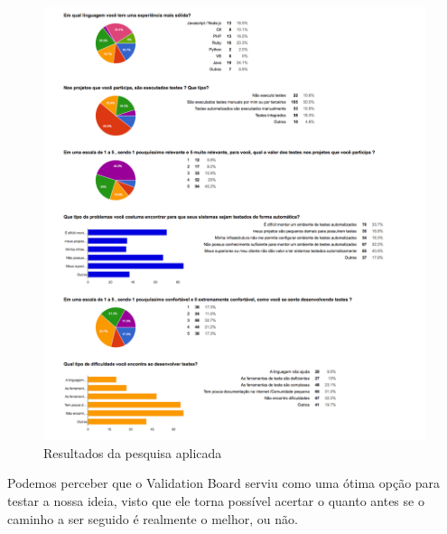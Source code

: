 \begin{figure}
  \centering
  \includegraphics[width=1.1\textwidth]{imagens/results.png}
  \caption{Resultados da pesquisa aplicada}
  \label{fig:LABEL_FIG_5}
\end{figure}

Podemos perceber que o Validation Board serviu como uma ótima opção para testar a nossa ideia, visto que ele torna possível acertar o quanto antes se o caminho a ser seguido é realmente o melhor, ou não.
